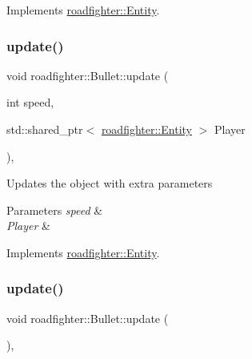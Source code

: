 Implements \hyperlink{classroadfighter_1_1Entity_ad0ecaa0539db252e591da83814251509}{roadfighter\+::\+Entity}.

\mbox{\label{classroadfighter_1_1Bullet_a9027c832dce3cd2839192255e0dbf301}} 
\subsubsection{\texorpdfstring{update()}{update()}\hspace{0.1cm}{\footnotesize\ttfamily [1/2]}}
{\footnotesize\ttfamily void roadfighter\+::\+Bullet\+::update (\begin{DoxyParamCaption}\item[{int}]{speed,  }\item[{std\+::shared\+\_\+ptr$<$ \hyperlink{classroadfighter_1_1Entity}{roadfighter\+::\+Entity} $>$}]{Player }\end{DoxyParamCaption})\hspace{0.3cm}{\ttfamily [override]}, {\ttfamily [virtual]}}

Updates the object with extra parameters 
\begin{DoxyParams}{Parameters}
{\em speed} & \\
\hline
{\em Player} & \\
\hline
\end{DoxyParams}


Implements \hyperlink{classroadfighter_1_1Entity_a611ba56595dd2137d308876ba820cc09}{roadfighter\+::\+Entity}.

\mbox{\label{classroadfighter_1_1Bullet_aab45c1cb9088b11c17e7a238543d8006}} 
\subsubsection{\texorpdfstring{update()}{update()}\hspace{0.1cm}{\footnotesize\ttfamily [2/2]}}
{\footnotesize\ttfamily void roadfighter\+::\+Bullet\+::update (\begin{DoxyParamCaption}{ }\end{DoxyParamCaption})\hspace{0.3cm}{\ttfamily [override]}, {\ttfamily [virtual]}}

